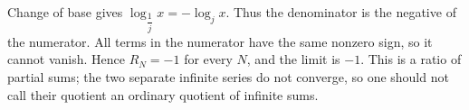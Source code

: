 Change of base gives $\log_{\dfrac{1}{j}} x = - \log_j x$. Thus the denominator is the negative of the numerator. All terms in the numerator have the same nonzero sign, so it cannot vanish. Hence $R_N=-1$ for every $N$, and the limit is $\boxed{-1}$. This is a ratio of partial sums; the two separate infinite series do not converge, so one should not call their quotient an ordinary quotient of infinite sums.
